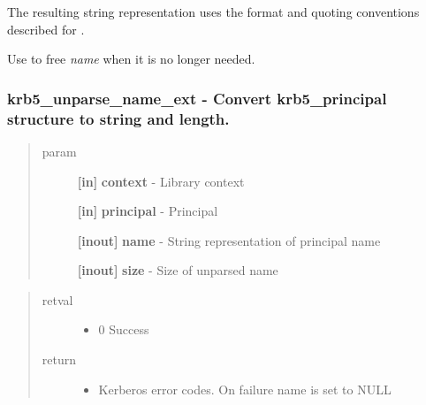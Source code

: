 \documentclass[letterpaper,10pt,english]{sphinxmanual}
\begin{document}
The resulting string representation uses the format and quoting conventions described for {\hyperref[appdev/refs/api/krb5_parse_name:krb5_parse_name]{}} .

Use {\hyperref[appdev/refs/api/krb5_free_unparsed_name:krb5_free_unparsed_name]{}} to free \emph{name} when it is no longer needed.


\subsubsection{krb5\_unparse\_name\_ext -  Convert krb5\_principal structure to string and length.}
\label{appdev/refs/api/krb5_unparse_name_ext:krb5-unparse-name-ext-convert-krb5-principal-structure-to-string-and-length}\label{appdev/refs/api/krb5_unparse_name_ext::doc}

\begin{fulllineitems}
\label{appdev/refs/api/krb5_unparse_name_ext:krb5_unparse_name_ext}
\end{fulllineitems}

\begin{quote}\begin{description}
\item[{param}] \leavevmode
\textbf{{[}in{]}} \textbf{context} - Library context

\textbf{{[}in{]}} \textbf{principal} - Principal

\textbf{{[}inout{]}} \textbf{name} - String representation of principal name

\textbf{{[}inout{]}} \textbf{size} - Size of unparsed name

\end{description}\end{quote}
\begin{quote}\begin{description}
\item[{retval}] \leavevmode\begin{itemize}
\item {} 
0   Success

\end{itemize}

\item[{return}] \leavevmode\begin{itemize}
\item {} 
Kerberos error codes. On failure name is set to NULL

\end{itemize}

\end{description}\end{quote}
\end{document}
